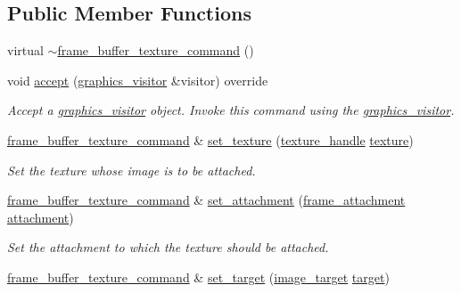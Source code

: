 \subsection*{Public Member Functions}
\begin{DoxyCompactItemize}
\item 
virtual \mbox{\hyperlink{classmoka_1_1frame__buffer__texture__command_a72fc6d54513756fe7ce7af898a41268f}{$\sim$frame\+\_\+buffer\+\_\+texture\+\_\+command}} ()
\item 
void \mbox{\hyperlink{classmoka_1_1frame__buffer__texture__command_a13187e36d3002ccdaa39c42b40d0034f}{accept}} (\mbox{\hyperlink{classmoka_1_1graphics__visitor}{graphics\+\_\+visitor}} \&visitor) override
\begin{DoxyCompactList}\small\item\em Accept a \mbox{\hyperlink{classmoka_1_1graphics__visitor}{graphics\+\_\+visitor}} object. Invoke this command using the \mbox{\hyperlink{classmoka_1_1graphics__visitor}{graphics\+\_\+visitor}}. \end{DoxyCompactList}\item 
\mbox{\hyperlink{classmoka_1_1frame__buffer__texture__command}{frame\+\_\+buffer\+\_\+texture\+\_\+command}} \& \mbox{\hyperlink{classmoka_1_1frame__buffer__texture__command_a93fffc45f26b679fd50f139c8dbc3a7d}{set\+\_\+texture}} (\mbox{\hyperlink{structmoka_1_1texture__handle}{texture\+\_\+handle}} \mbox{\hyperlink{classmoka_1_1frame__buffer__texture__command_ac6986f87b2adb0c62e14f4b4989a19ff}{texture}})
\begin{DoxyCompactList}\small\item\em Set the texture whose image is to be attached. \end{DoxyCompactList}\item 
\mbox{\hyperlink{classmoka_1_1frame__buffer__texture__command}{frame\+\_\+buffer\+\_\+texture\+\_\+command}} \& \mbox{\hyperlink{classmoka_1_1frame__buffer__texture__command_a6ae9bc7d6a29e0dac6bd13b69d5b6b5e}{set\+\_\+attachment}} (\mbox{\hyperlink{namespacemoka_a0a44ecbb877dec1107d9915dc95c58d1}{frame\+\_\+attachment}} \mbox{\hyperlink{classmoka_1_1frame__buffer__texture__command_af5113c5b0be55658fdd03b2823dd5038}{attachment}})
\begin{DoxyCompactList}\small\item\em Set the attachment to which the texture should be attached. \end{DoxyCompactList}\item 
\mbox{\hyperlink{classmoka_1_1frame__buffer__texture__command}{frame\+\_\+buffer\+\_\+texture\+\_\+command}} \& \mbox{\hyperlink{classmoka_1_1frame__buffer__texture__command_a8a3e58975b0fcdbfc4ad1119cfbeb51d}{set\+\_\+target}} (\mbox{\hyperlink{namespacemoka_a6f402ae62a72ce17ff73fa94d526800e}{image\+\_\+target}} \mbox{\hyperlink{classmoka_1_1frame__buffer__texture__command_ac8ac280263dfea329a3a0d0d7650a802}{target}})

\end{DoxyCompactItemize}

